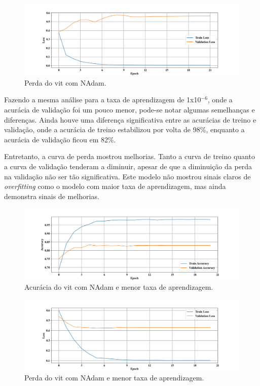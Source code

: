 \begin{figure}[tb]
\centerline{\includegraphics[width=1\linewidth]{images/resultados/nadam_loss.png}}
\caption{Perda do \acrshort{vit} com NAdam.}
\label{fig:nadam_loss}
\end{figure}

Fazendo a mesma análise para a taxa de aprendizagem de 1x10$^{-6}$, onde a acurácia de validação foi um pouco menor, pode-se notar algumas semelhanças e diferenças.
Ainda houve uma diferença significativa entre as acurácias de treino e validação, onde a acurácia de treino estabilizou por volta de 98\%, enquanto a acurácia de validação ficou em 82\%.

Entretanto, a curva de perda mostrou melhorias. 
Tanto a curva de treino quanto a curva de validação tenderam a diminuir, apesar de que a diminuição da perda na validação não ser tão significativa.
Este modelo não mostrou sinais claros de \textit{overfitting} como o modelo com maior taxa de aprendizagem, mas ainda demonstra sinais de melhorias.

\begin{figure}[tb]
     \centerline{\includegraphics[width=1\linewidth]{images/resultados/nadam_accuracy_1e06.png}}
     \caption{Acurácia do \acrshort{vit} com NAdam e menor taxa de aprendizagem.}
     \label{fig:nadam_acc_1x1006}
\end{figure}
     
\begin{figure}[tb]
     \centerline{\includegraphics[width=1\linewidth]{images/resultados/nadam_loss_1e06.png}}
     \caption{Perda do \acrshort{vit} com NAdam e menor taxa de aprendizagem.}
     \label{fig:nadam_loss_1x1006}
\end{figure}

